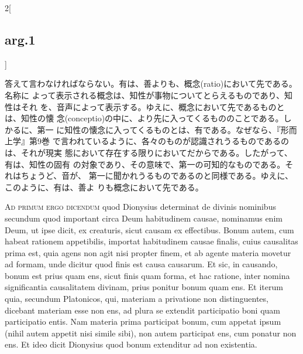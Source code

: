 \documentclass[paper=a4paper,fontsize=10pt,jafontsize=9pt,titlepage]{jlreq}
\begin{document}
\begin{paracol}{2}[\subsection{arg.1}]
\switchcolumn

答えて言わなければならない。有は、善よりも、概念(ratio)において先である。名称に
 よって表示される概念は、知性が事物についてとらえるものであり、知性はそれ
 を、音声によって表示する。ゆえに、概念において先であるものとは、知性の懐
 念(conceptio)の中に、より先に入ってくるもののことである。しかるに、第一
 に知性の懐念に入ってくるものとは、有である。なぜなら、『形而上学』第9巻
 で言われているように、各々のものが認識されうるものであるのは、それが現実
 態において存在する限りにおいてだからである。したがって、有は、知性の固有
 の対象であり、その意味で、第一の可知的なものである。それはちょうど、音が、
 第一に聞かれうるものであるのと同様である。ゆえに、このように、有は、善よ
 りも概念において先である。

\switchcolumn*[\subsection{ad.1}]

{\scshape Ad primum ergo dicendum} quod Dionysius determinat de divinis
 nominibus secundum quod important circa Deum habitudinem causae,
 nominamus enim Deum, ut ipse dicit, ex creaturis, sicut causam ex
 effectibus. Bonum autem, cum habeat rationem appetibilis, importat
 habitudinem causae finalis, cuius causalitas prima est, quia agens non
 agit nisi propter finem, et ab agente materia movetur ad formam, unde
 dicitur quod finis est causa causarum. Et sic, in causando, bonum est
 prius quam ens, sicut finis quam forma, et hac ratione, inter nomina
 significantia causalitatem divinam, prius ponitur bonum quam ens. Et
 iterum quia, secundum Platonicos, qui, materiam a privatione non
 distinguentes, dicebant materiam esse non ens, ad plura se extendit
 participatio boni quam participatio entis. Nam materia prima participat
 bonum, cum appetat ipsum (nihil autem appetit nisi simile sibi), non
 autem participat ens, cum ponatur non ens. Et ideo dicit Dionysius quod
 bonum extenditur ad non existentia.

\switchcolumn


\end{paracol}
\end{document}
